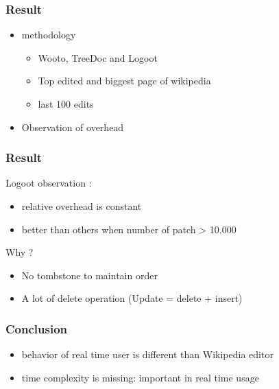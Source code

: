 \documentclass[14pt]{beamer}
\begin{document}
	\begin{frame}
		\frametitle{Result}
		\begin{itemize}
			\item methodology
				\begin{itemize}
					\item Wooto, TreeDoc and Logoot
					\item Top edited and biggest page of wikipedia
					\item last 100 edits
				\end{itemize}
			\item Observation of overhead
		\end{itemize}
		
	\end{frame}

	\begin{frame}
		\frametitle{Result}
			Logoot observation :
			\begin{itemize}
					\item relative overhead is constant
					\item better than others when number of patch > 10.000 
			\end{itemize}
			Why ?
			\begin{itemize}
				\item No tombstone to maintain order
				\item A lot of delete operation (Update = delete + insert)
			\end{itemize}
	\end{frame}

	\begin{frame}
		\frametitle{Conclusion}
			\begin{itemize}
				\item behavior of real time user is different than Wikipedia editor
				\item time complexity is missing: important in real time usage
			\end{itemize}
	\end{frame}
\end{document}
